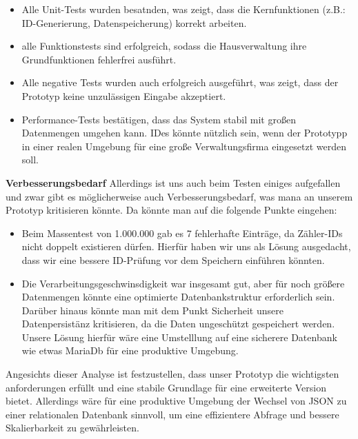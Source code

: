 \begin{itemize}
    \item Alle Unit-Tests wurden besatnden, was zeigt, dass die Kernfunktionen (z.B.: ID-Generierung, Datenspeicherung) korrekt arbeiten.
    \item alle Funktionstests sind erfolgreich, sodass die Hausverwaltung ihre Grundfunktionen fehlerfrei ausführt.
    \item Alle negative Tests wurden auch erfolgreich ausgeführt, was zeigt, dass der Prototyp keine unzulässigen Eingabe akzeptiert.
    \item Performance-Tests bestätigen, dass das System stabil mit großen Datenmengen umgehen kann. IDes könnte nützlich sein, wenn der Prototypp in einer realen Umgebung für eine große Verwaltungsfirma eingesetzt werden soll.
\end{itemize}

\textbf{Verbesserungsbedarf}
Allerdings ist uns auch beim Testen einiges aufgefallen und zwar gibt es möglicherweise auch Verbesserungsbedarf, was mana an unserem Prototyp kritisieren könnte.
Da könnte man auf die folgende Punkte eingehen:
\begin{itemize}
    \item Beim Massentest von 1.000.000 gab es 7 fehlerhafte Einträge, da Zähler-IDs nicht doppelt existieren dürfen. Hierfür haben wir uns als Lösung ausgedacht, dass wir eine bessere ID-Prüfung vor dem Speichern einführen könnten.
    \item Die Verarbeitungsgeschwinsdigkeit war insgesamt gut, aber für noch größere Datenmengen könnte eine optimierte Datenbankstruktur erforderlich sein. Darüber hinaus könnte man mit dem Punkt Sicherheit unsere Datenpersistänz kritisieren, da die Daten ungeschützt gespeichert werden.
    Unsere Lösung hierfür wäre eine Umstelllung auf eine sicherere Datenbank wie etwas MariaDb für eine produktive Umgebung.
\end{itemize} 

Angesichts dieser Analyse ist festzustellen, dass unser Prototyp die wichtigsten anforderungen erfüllt und eine stabile Grundlage für eine erweiterte Version bietet.
Allerdings wäre für eine produktive Umgebung der Wechsel von JSON zu einer relationalen Datenbank sinnvoll, um eine effizientere Abfrage und bessere Skalierbarkeit zu gewährleisten.
